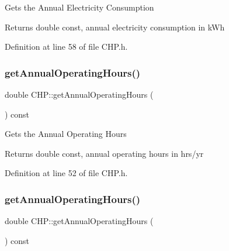Gets the Annual Electricity Consumption

\begin{DoxyReturn}{Returns}
double const, annual electricity consumption in k\+Wh 
\end{DoxyReturn}


Definition at line 58 of file C\+H\+P.\+h.

\mbox{\label{class_c_h_p_aeeb03f1f40db034babf883a1e00ed2a3}} 
\subsubsection{\texorpdfstring{get\+Annual\+Operating\+Hours()}{getAnnualOperatingHours()}\hspace{0.1cm}{\footnotesize\ttfamily [1/3]}}
{\footnotesize\ttfamily double C\+H\+P\+::get\+Annual\+Operating\+Hours (\begin{DoxyParamCaption}{ }\end{DoxyParamCaption}) const\hspace{0.3cm}{\ttfamily [inline]}}

Gets the Annual Operating Hours

\begin{DoxyReturn}{Returns}
double const, annual operating hours in hrs/yr 
\end{DoxyReturn}


Definition at line 52 of file C\+H\+P.\+h.

\mbox{\label{class_c_h_p_aeeb03f1f40db034babf883a1e00ed2a3}} 
\subsubsection{\texorpdfstring{get\+Annual\+Operating\+Hours()}{getAnnualOperatingHours()}\hspace{0.1cm}{\footnotesize\ttfamily [2/3]}}
{\footnotesize\ttfamily double C\+H\+P\+::get\+Annual\+Operating\+Hours (\begin{DoxyParamCaption}{ }\end{DoxyParamCaption}) const\hspace{0.3cm}{\ttfamily [inline]}}

